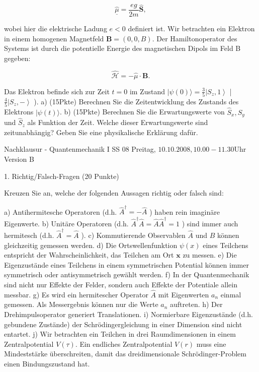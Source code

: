 \documentclass[11pt,a4paper]{article}
\begin{document}
$$
\hat{\underline{\mu}}=\frac{e g}{2 m} \hat{\mathbf{S}},
$$

wobei hier die elektrische Ladung $e<0$ definiert ist. Wir betrachten ein Elektron in einem homogenen Magnetfeld $\mathbf{B}=(0,0, B)$. Der Hamiltonoperator des Systems ist durch die potentielle Energie des magnetischen Dipols im Feld B gegeben:

$$
\hat{\mathcal{H}}=-\hat{\mu} \cdot \mathbf{B} .
$$


Das Elektron befinde sich zur Zeit $t=0$ im Zustand $|\psi(0)\rangle=\frac{3}{5}\left|S_z, 1\right\rangle$ | $\frac{4}{5}\left|S_z,-\right\rangle$ ).
a) (15Pkte) Berechnen Sie die Zeitentwicklung des Zustands des Elektrons $|\psi(t)\rangle$.
b) (15Pkte) Berechnen Sie die Erwartungswerte von $\hat{S}_x, \hat{S}_y$ und $\hat{S}_z$ als Funktion der Zeit. Welche dieser Erwartungswerte sind zeitunabhängig? Geben Sie eine physikalische Erklärung dafür.

\pagebreak



Nachklausur - Quantenmechanik I SS 08
Preitag, $10.10 .2008,10.00-11.30 \mathrm{Uhr}$
Version B



1. Richtig/Falsch-Fragen (20 Punkte)

Kreuzen Sie an, welche der folgenden Aussagen richtig oder falsch sind:

a) Antihermitesche Operatoren (d.h. $\hat{A}^{\dagger}=-\hat{A}$ ) haben rein imaginäre Eigenwerte.
b) Unitäre Operatoren (d.h. $\hat{A}^{\dagger} \hat{A}=\hat{A} \hat{A}^{\dagger}=1$ ) sind immer auch hermitesch (d.h. $\hat{A}^{\dagger}=\hat{A}$ ).
c) Kommutierende Observablen $\hat{A}$ und $\hat{B}$ können gleichzeitig gemessen werden.
d) Die Ortswellenfunktion $\psi(x)$ eines Teilchens entspricht der Wahrscheinlichkeit, das Teilchen am Ort $\mathbf{x}$ zu messen.
e) Die Eigenzustände eines Teilchens in einem symmetrischen Potential können immer symmetrisch oder antisymmetrisch gewählt werden.
f) In der Quantenmechanik sind nicht nur Effekte der Felder, sondern auch Effekte der Potentiale allein messbar.
g) Es wird ein hermitescher Operator $\hat{A}$ mit Eigenwerten $a_n$ einmal gemessen. Als Messergebnis können nur die Werte $a_n$ auftreten.
h) Der Drehimpulsoperator generiert Translationen.
i) Normierbare Eigenzustände (d.h. gebundene Zustände) der Schrödingergleichung in einer Dimension sind nicht entartet.
j) Wir betrachten ein Teilchen in drei Raumdimensionen in einem Zentralpotential $V(\tau)$. Ein endliches Zentralpotential $V(r)$ muss eine Mindeststärke überschreiten, damit das dreidimensionale Schrödinger-Problem einen Bindungszustand hat.
\end{document}
